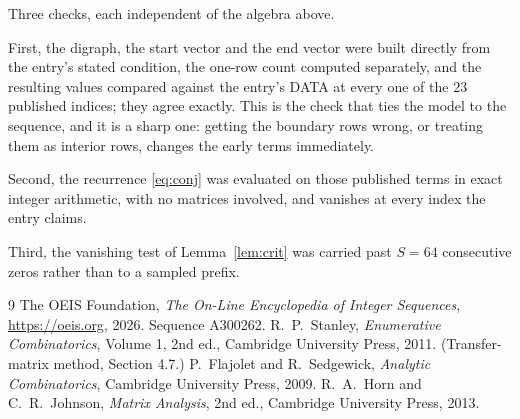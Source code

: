 \documentclass[11pt,a4paper]{article}
\theoremstyle{plain}
\theoremstyle{definition}
\begin{document}
Three checks, each independent of the algebra above.

First, the digraph, the start vector and the end vector were built directly from the
entry's stated condition, the one-row count computed separately, and the resulting values
compared against the entry's DATA at every one of the $23$ published indices; they
agree exactly. This is the check that ties the model to the sequence, and it is a sharp one:
getting the boundary rows wrong, or treating them as interior rows, changes the early terms
immediately.

Second, the recurrence \eqref{eq:conj} was evaluated on those published terms in exact
integer arithmetic, with no matrices involved, and vanishes at every index the entry claims.

Third, the vanishing test of Lemma~\ref{lem:crit} was carried past $S=64$ consecutive
zeros rather than to a sampled prefix.

\begin{thebibliography}{9}
 The OEIS Foundation, \emph{The On-Line Encyclopedia of Integer
Sequences}, \url{https://oeis.org}, 2026. Sequence A300262.
 R.~P.~Stanley, \emph{Enumerative Combinatorics}, Volume 1, 2nd ed.,
Cambridge University Press, 2011. (Transfer-matrix method, Section 4.7.)
 P.~Flajolet and R.~Sedgewick, \emph{Analytic Combinatorics}, Cambridge
University Press, 2009.
 R.~A.~Horn and C.~R.~Johnson, \emph{Matrix Analysis}, 2nd ed., Cambridge
University Press, 2013.
\end{thebibliography}
\end{document}
